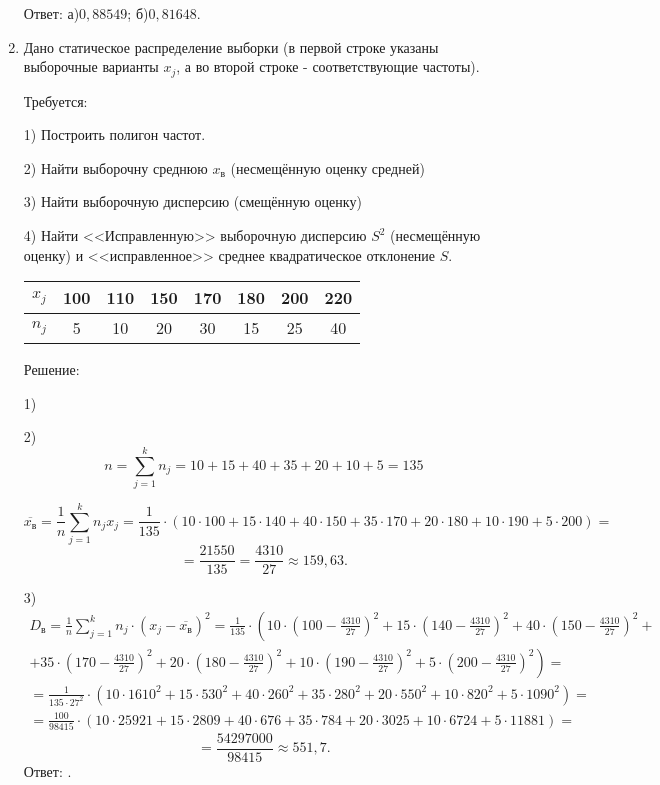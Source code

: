 \documentclass{article}
\begin{document}
\begin{enumerate}
Ответ: а)$0,88549$; б)$0,81648$.

\item %
Дано статическое распределение выборки (в первой строке указаны выборочные варианты $x_j$, а во второй строке - соответствующие частоты).

Требуется:

1) Построить полигон частот.

2) Найти выборочну среднюю $x_\textit{в}$ (несмещённую оценку средней)

3) Найти выборочную дисперсию (смещённую оценку)

4) Найти <<Исправленную>> выборочную дисперсию $S^2$ (несмещённую оценку) и <<исправленное>> среднее квадратическое отклонение $S$.

\begin{center}
\begin{tabular}{|c|c|c|c|c|c|c|c|}
\hline
$x_j$ & 100 & 110 & 150 & 170 & 180 & 200 & 220 \\
\hline
$n_j$ & 5 & 10 & 20 & 30 & 15 & 25 & 40 \\
\hline
\end{tabular}
\end{center}
\begin{center}Решение:\end{center}
1)

2) $$n=\sum_{j=1}^k n_j=10+15+40+35+20+10+5=135$$

$$\overline{x_\textit{в}}=\frac{1}{n}\sum_{j=1}^k n_j x_j=\frac{1}{135}\cdot\left(10\cdot100+15\cdot140+40\cdot150+35\cdot170+20\cdot180+10\cdot190+5\cdot200\right)=$$
$$=\frac{21550}{135}=\frac{4310}{27}\approx159,63.$$

3)
\begin{multline*}
D_{\textit{в}}=\frac{1}{n}\sum_{j=1}^k n_j
\cdot\left(x_j-\overline{x_\textit{в}}\right)^2=
\frac{1}{135}\cdot\left(10\cdot\left(100-\frac{4310}{27}\right)^2+15\cdot\left(140-\frac{4310}{27}\right)^2+40\cdot\left(150-\frac{4310}{27}\right)^2+\right.\\
+\left.35\cdot\left(170-\frac{4310}{27}\right)^2+20\cdot\left(180-\frac{4310}{27}\right)^2+10\cdot\left(190-\frac{4310}{27}\right)^2+5\cdot\left(200-\frac{4310}{27}\right)^2\right)=\\
=\frac{1}{135\cdot27^2}\cdot\left(10\cdot1610^2+15\cdot530^2+40\cdot260^2+35\cdot280^2+20\cdot550^2+10\cdot820^2+5\cdot1090^2\right)=\\
=\frac{100}{98415}\cdot\left(10\cdot25921+15\cdot2809+40\cdot676+35\cdot784+20\cdot3025+10\cdot6724+5\cdot11881\right)=
\end{multline*}
$$=\frac{54297000}{98415}\approx551,7.$$
Ответ: $ $.


\end{enumerate}
\end{document}
